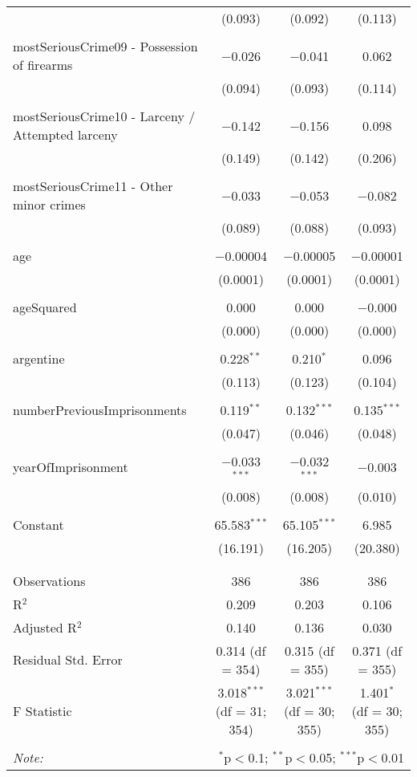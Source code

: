 \documentclass{article}
\begin{document}
\begin{table}[!htbp]
{\begin{tabular}{@{\extracolsep{5pt}}lccc}
  & (0.093) & (0.092) & (0.113) \\ 
  & & & \\ 
 mostSeriousCrime09 - Possession of firearms & $-$0.026 & $-$0.041 & 0.062 \\ 
  & (0.094) & (0.093) & (0.114) \\ 
  & & & \\ 
 mostSeriousCrime10 - Larceny / Attempted larceny & $-$0.142 & $-$0.156 & 0.098 \\ 
  & (0.149) & (0.142) & (0.206) \\ 
  & & & \\ 
 mostSeriousCrime11 - Other minor crimes & $-$0.033 & $-$0.053 & $-$0.082 \\ 
  & (0.089) & (0.088) & (0.093) \\ 
  & & & \\ 
 age & $-$0.00004 & $-$0.00005 & $-$0.00001 \\ 
  & (0.0001) & (0.0001) & (0.0001) \\ 
  & & & \\ 
 ageSquared & 0.000 & 0.000 & $-$0.000 \\ 
  & (0.000) & (0.000) & (0.000) \\ 
  & & & \\ 
 argentine & 0.228$^{**}$ & 0.210$^{*}$ & 0.096 \\ 
  & (0.113) & (0.123) & (0.104) \\ 
  & & & \\ 
 numberPreviousImprisonments & 0.119$^{**}$ & 0.132$^{***}$ & 0.135$^{***}$ \\ 
  & (0.047) & (0.046) & (0.048) \\ 
  & & & \\ 
 yearOfImprisonment & $-$0.033$^{***}$ & $-$0.032$^{***}$ & $-$0.003 \\ 
  & (0.008) & (0.008) & (0.010) \\ 
  & & & \\ 
 
 Constant & 65.583$^{***}$ & 65.105$^{***}$ & 6.985 \\ 
  & (16.191) & (16.205) & (20.380) \\ 
  & & & \\ 
\hline \\[-1.8ex] 
Observations & 386 & 386 & 386 \\ 
R$^{2}$ & 0.209 & 0.203 & 0.106 \\ 
Adjusted R$^{2}$ & 0.140 & 0.136 & 0.030 \\ 
Residual Std. Error & 0.314 (df = 354) & 0.315 (df = 355) & 0.371 (df = 355) \\ 
F Statistic & 3.018$^{***}$ (df = 31; 354) & 3.021$^{***}$ (df = 30; 355) & 1.401$^{*}$ (df = 30; 355) \\ 
\hline 
\hline \\[-1.8ex] 
\textit{Note:}  & \multicolumn{3}{r}{$^{*}$p$<$0.1; $^{**}$p$<$0.05; $^{***}$p$<$0.01} \\ 
\end{tabular} }
\end{table} 
\end{document}
